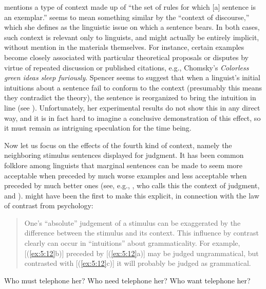 \citet{Spencer1973} mentions a type of context made up of ``the set of rules for which [a] sentence is an exemplar.'' \citet{Snow1975} seems to mean something similar by the ``context of discourse,'' which she defines as the linguistic issue on which a sentence bears. In both cases, such context is relevant only to linguists, and might actually be entirely implicit, without mention in the materials themselves. For instance, certain examples become closely associated with particular theoretical proposals or disputes by virtue of repeated discussion or published citations, e.g., Chomsky's \textit{Colorless green ideas sleep furiously}. Spencer seems to suggest that when a linguist's initial intuitions about a sentence fail to conform to the context (presumably this means they contradict the theory), the sentence is reorganized to bring the intuition in line (see ). Unfortunately, her experimental results do not show this in any direct way, and it is in fact hard to imagine a conclusive demonstration of this effect, so it must remain as intriguing speculation for the time being.

Now let us focus on the effects of the fourth kind of context, namely the neighboring stimulus sentences displayed for judgment. It has been common folklore among linguists that marginal sentences can be made to seem more acceptable when preceded by much worse examples and less acceptable when preceded by much better ones (see, e.g., \citet{Snow1975}, who calls this the context of judgment, and \citet[vol. 3]{Levelt1974}). \citet{Bever1970a,Bever1974} might have been the first to make this explicit, in connection with the law of contrast from psychology:

\begin{quote}
One's ``absolute'' judgement of a stimulus can be exaggerated by the difference between the stimulus and its context. This influence by contrast clearly can occur in ``intuitions'' about grammaticality. For example, [(\ref{ex:5:12}b)] preceded by [(\ref{ex:5:12}a)] may be judged ungrammatical, but contrasted with [(\ref{ex:5:12}c)] it will probably be judged as grammatical. \citep[346\textendash{}47]{Bever1970a}
\end{quote}

\ea \label{ex:5:12}
\ea
Who must telephone her? 
\ex Who need telephone her? 
\ex Who want telephone her?
\z
\z

